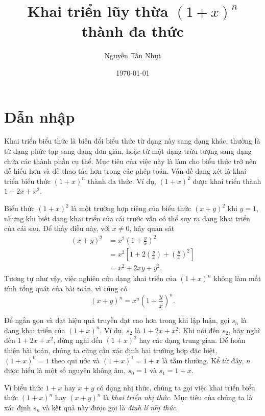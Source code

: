 \documentclass[12pt]{article} %
\title{Khai triển lũy thừa \texorpdfstring{\((1+x)^n\)}{nhị thức} thành đa thức} %
\author{Nguyễn Tấn Nhựt}
\date{\today}
\begin{document}
\maketitle


\section{Dẫn nhập} \label{sec:dan-nhap}
Khai triển biểu thức là biến đổi biểu thức từ dạng này sang dạng khác, thường là từ dạng phức tạp sang dạng đơn giản, hoặc từ một dạng trừu tượng sang dạng chứa các thành phần cụ thể. Mục tiêu của việc này là làm cho biểu thức trở nên dễ hiểu hơn và dễ thao tác hơn trong các phép toán. Vấn đề đang xét là khai triển biểu thức \((1+x)^n\) thành đa thức. Ví dụ, \((1+x)^2\) được khai triển thành \(1+2x+x^2\). 

Biểu thức \((1+x)^2\) là một trường hợp riêng của biểu thức \((x+y)^2\) khi \(y=1\), nhưng khi biết dạng khai triển của cái trước vẫn có thể suy ra dạng khai triển của cái sau. Để thấy điều này, với \(x\ne 0\), hãy quan sát 
    \begin{align*}
        (x+y)^2
            &=x^2\left(1+\frac{y}{x}\right)^2 \\
            &=x^2\left[1+2\left(\frac{y}{x}\right)+\left(\frac{y}{x}\right)^2\right] \\
            &=x^2+2xy+y^2.
    \end{align*}
Tương tự như vậy, việc nghiên cứu dạng khai triển của \((1+x)^n\) không làm mất tính tổng quát của bài toán, vì cũng có
\[(x+y)^n=x^n\left(1+\frac{y}{x}\right)^n.\]

Để ngắn gọn và đạt hiệu quả truyền đạt cao hơn trong khi lập luận, gọi \(s_n\) là dạng khai triển của \((1+x)^n\). Ví dụ, \(s_2\) là \(1+2x+x^2\). Khi nói đến \(s_2\), hãy nghĩ đến \(1+2x+x^2\), đừng nghĩ đến \((1+x)^2\) hay các dạng trung gian. Để hoàn thiện bài toán, chúng ta cũng cần xác định hai trường hợp đặc biệt, \((1+x)^0=1\) theo qui ước và \((1+x)^1=1+x\) là tầm thường. Kể từ đây, \(n\) được hiểu là một số nguyên không âm, \(s_0=1\) và \(s_1=1+x\).

Vì biểu thức \(1+x\) hay \(x+y\) có dạng nhị thức, chúng ta gọi việc khai triển biểu thức \((1+x)^n\) hay \((x+y)^n\) là \emph{khai triển nhị thức}. Mục tiêu của chúng ta là xác định \(s_n\) và kết quả này được gọi là \emph{định lí nhị thức}.

\end{document}
